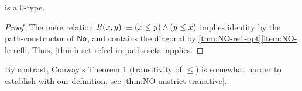\begin{cor}\label{thm:NO-set}
  \NO is a 0-type.
\end{cor}
\begin{proof}
  The mere relation $R(x,y)\vcentcolon\equiv (x\le y) \land (y\le x)$ implies identity by the path-constructor of $\mathsf{No}$, and contains the diagonal by \autoref{thm:NO-refl-opt}\ref{item:NO-le-refl}.
  Thus, \autoref{thm:h-set-refrel-in-paths-sets} applies.
\end{proof}

By contrast, Conway's Theorem 1 (transitivity of $\le$) is somewhat harder to establish with our definition; see \autoref{thm:NO-unstrict-transitive}.



